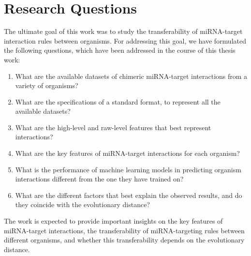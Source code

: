 \chapter{Research Questions}
\label{chap:rq}

The ultimate goal of this work was to study the transferability of miRNA-target interaction rules between organisms. For addressing this goal, we have formulated the following questions, which have been addressed in the course of this thesis work:
\begin{enumerate}
\item What are the available datasets of chimeric miRNA-target interactions from a variety of organisms?
\item What are the specifications of a standard format, to represent all the available datasets?
\item What are the high-level and raw-level features that best represent interactions?
\item What are the key features of miRNA-target interactions for each organism?
\item What is the performance of machine learning models in predicting organism interactions different from the one they have trained on?
\item What are the different factors that best explain the observed results, and do they coincide with the evolutionary distance?
\end{enumerate}

The work is expected to provide important insights on the key features of miRNA-target interactions, the transferability of miRNA-targeting rules between different organisms, and whether this transferability depends on the evolutionary distance.


